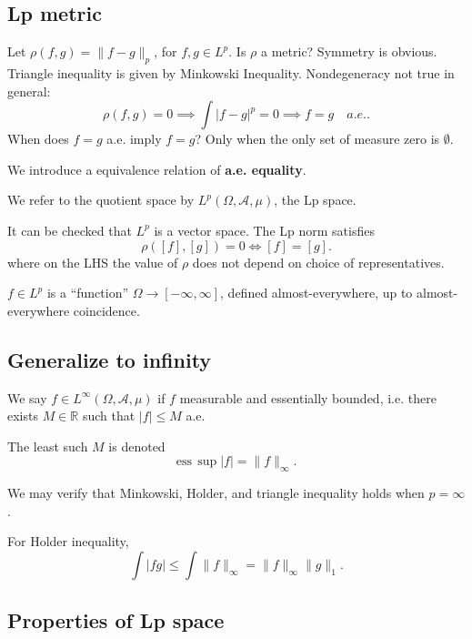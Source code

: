\subsection{Lp metric}

Let $\rho(f, g) = \| f - g\|_p$, for $f, g \in L^p$. Is $\rho$ a metric? Symmetry is obvious. Triangle inequality is given by Minkowski Inequality. Nondegeneracy not true in general:
\[
	\rho(f, g) = 0 \implies \int |f - g|^p = 0 \implies f = g \quad a.e.
.\] 
When does $f = g$ a.e. imply $f = g$? Only when the only set of measure zero is $\emptyset $. 

We introduce a equivalence relation of \textbf{a.e. equality}. 

We refer to the quotient space by $L^p(\Omega, \mathcal{A}, \mu)$, the Lp space.

It can be checked that $L^p$ is a vector space.
The Lp norm satisfies
\[
	\rho([f], [g]) = 0 \iff  [f] = [g]
.\] 
where on the LHS the value of $\rho$ does not depend on choice of representatives.

\begin{notation}
	$f \in L^p$ is a ``function'' $\Omega \to [-\infty , \infty ]$, defined almost-everywhere, up to almost-everywhere coincidence.
\end{notation}

\subsection{Generalize to infinity}

\begin{definition}
	We say $f \in L^\infty (\Omega, \mathcal{A}, \mu)$ if $f$ measurable and essentially bounded, i.e. there exists $M \in \mathbb{R}$ such that $|f| \le M$ a.e.

	The least such $M$ is denoted
	\[
		\text{ess} \, \sup  |f| = \|f\|_{\infty }
	.\] 
\end{definition}

We may verify that Minkowski, Holder, and triangle inequality holds when $p = \infty $.

\begin{example}
	For Holder inequality,
	\[
		\int |fg| \le \int \|f\|_\infty = \|f\|_{\infty } \|g\|_1
	.\] 
\end{example}

\subsection{Properties of Lp space}

